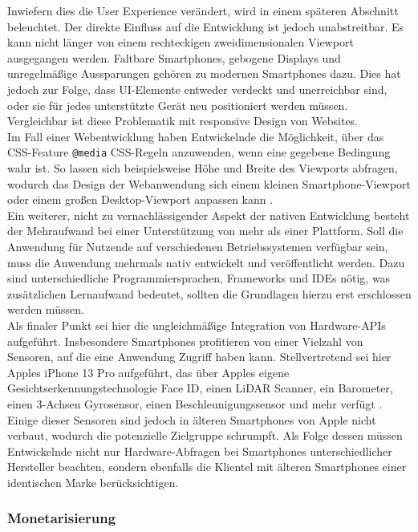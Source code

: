 \documentclass[a4paper]{scrartcl}
\begin{document}
Inwiefern dies die User Experience verändert, wird in einem späteren Abschnitt beleuchtet. Der direkte Einfluss auf die Entwicklung ist jedoch unabstreitbar. Es kann nicht länger von einem rechteckigen zweidimensionalen Viewport ausgegangen werden. Faltbare Smartphones, gebogene Displays und unregelmäßige Aussparungen gehören zu modernen Smartphones dazu. Dies hat jedoch zur Folge, dass UI-Elemente entweder verdeckt und unerreichbar sind, oder sie für jedes unterstützte Gerät neu positioniert werden müssen. Vergleichbar ist diese Problematik mit responsive Design von Websites. \\
Im Fall einer Webentwicklung haben Entwickelnde die Möglichkeit, über das CSS-Feature \texttt{@media} CSS-Regeln anzuwenden, wenn eine gegebene Bedingung wahr ist. So lassen sich beispielsweise Höhe und Breite des Viewports abfragen, wodurch das Design der Webanwendung sich einem kleinen Smartphone-Viewport oder einem großen Desktop-Viewport anpassen kann \autocite{Media_Queries}. \\

Ein weiterer, nicht zu vernachlässigender Aspekt der nativen Entwicklung besteht der Mehraufwand bei einer Unterstützung von mehr als einer Plattform. Soll die Anwendung für Nutzende auf verschiedenen Betriebssystemen verfügbar sein, muss die Anwendung mehrmals nativ entwickelt und veröffentlicht werden. Dazu sind unterschiedliche Programmiersprachen, Frameworks und IDEs nötig, was zusätzlichen Lernaufwand bedeutet, sollten die Grundlagen hierzu erst erschlossen werden müssen. \\

Als finaler Punkt sei hier die ungleichmäßige Integration von Hardware-APIs aufgeführt. Insbesondere Smartphones profitieren von einer Vielzahl von Sensoren, auf die eine Anwendung Zugriff haben kann. Stellvertretend sei hier Apples iPhone 13 Pro aufgeführt, das über Apples eigene Gesichtserkennungstechnologie Face ID, einen LiDAR Scanner, ein Barometer, einen 3-Achsen Gyrosensor, einen Beschleunigungssensor und mehr verfügt \autocite{iPhone13_specs}. Einige dieser Sensoren sind jedoch in älteren Smartphones von Apple nicht verbaut, wodurch die potenzielle Zielgruppe schrumpft. Als Folge dessen müssen Entwickelnde nicht nur Hardware-Abfragen bei Smartphones unterschiedlicher Hersteller beachten, sondern ebenfalls die Klientel mit älteren Smartphones einer identischen Marke berücksichtigen.


\subsubsection{Monetarisierung}
\end{document}
